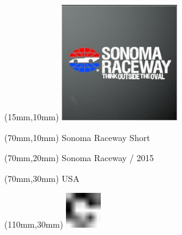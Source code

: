 \null\newpage
\begin{textblock*}{50mm}(15mm,10mm)%
\includegraphics[width=50mm]{LG/2015-05-20_00096.png}
\end{textblock*}
\begin{textblock*}{130mm}(70mm,10mm)%
{\fontsize{20}{20}\selectfont Sonoma Raceway Short}\\
\end{textblock*}
\begin{textblock*}{120mm}(70mm,20mm)%
{\fontsize{16}{16}\selectfont Sonoma Raceway / 2015}\\
\end{textblock*}
\begin{textblock*}{120mm}(70mm,30mm)%
{\fontsize{12}{12}\selectfont USA}
\end{textblock*}
\begin{textblock*}{30mm}(110mm,30mm)%
\centering
\includegraphics[height=15mm]{icons/fa-rotate-right.pdf}
\end{textblock*}
